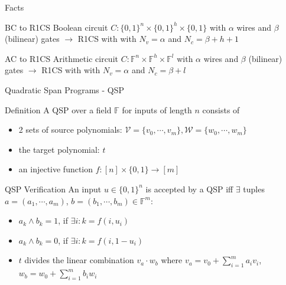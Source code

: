 \documentclass[handout]{beamer}
\begin{document}
\begin{frame}{Facts}
\begin{block}{BC to R1CS}
Boolean circuit $C: \{0,1\}^n \times \{0,1\}^h \times \{0,1\}$ with $\alpha$ wires and $\beta$ (bilinear) gates 
$\rightarrow$
R1CS with with $N_v = \alpha$ and $N_c = \beta + h+1$
\end{block}
\pause
\begin{block}{AC to R1CS}
Arithmetic circuit $C: \mathbb{F}^n \times \mathbb{F}^h \times \mathbb{F}^l$ with $\alpha$ wires and $\beta$ (bilinear) gates 
$\rightarrow$
R1CS with with $N_v = \alpha$ and $N_c = \beta + l$
\end{block}
 
\end{frame}

\begin{frame}[allowframebreaks]{Quadratic Span Programs - QSP}

\begin{block}{Definition}
A QSP over a field $\mathbb{F}$ for inputs of length $n$ consists of
\begin{itemize}
    \item 2 sets of source polynomials: $\mathcal{V} = \{v_0, \cdots, v_m \}, \mathcal{W} =\{ w_0, \cdots, w_m \}$  
    \item the target polynomial: $t$  
    \item an injective function $f : [n] \times \{0,1\} \rightarrow [m]$  
\end{itemize}
\end{block}

\framebreak 
\begin{block}{QSP Verification}
An input $u \in \{0,1\}^n$ is accepted by a QSP iff $\exists$ tuples  
$a = (a_1, \cdots, a_m)$, $b = (b_1, \cdots, b_m) \in \mathbb{F}^m:$

\begin{itemize}
    \item $a_k \land b_k = 1$, if $\exists i: k=f(i,u_i)$
    \item $a_k \land b_k = 0$, if $\exists i: k=f(i,1-u_i)$
    \item $t$ divides the linear combination $v_a \cdot w_b$ where 
     $v_a = v_0+\sum_{i=1}^m a_i v_i$, \\
     $w_b = w_0+\sum_{i=1}^m b_i w_i$
\end{itemize}

\end{block}

\framebreak


\end{frame}
\end{document}
